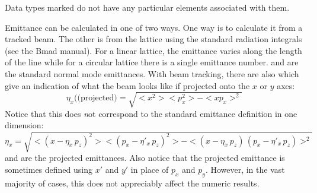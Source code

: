 Data types marked  do not have any particular elements
associated with them.

Emittance can be calculated in one of two ways. One way is to
calculate it from a tracked beam. The other is from the lattice using
the standard radiation integrals (see the Bmad manual). For a linear
lattice, the emittance varies along the length of the line while for a
circular lattice there is a single emittance number. 
and  are the standard normal mode emittances. With
beam tracking, there are also  which give an
indication of what the beam looks like if projected onto the $x$ or
$y$ axes:
\begin{equation}
  \eta_x (\mbox{(projected)} = \sqrt{<x^2> <p_x^2> - <x p_x>^2}
\end{equation}
Notice that this does {\emph not} correspond to the standard emittance
definition in one dimension:
\begin{equation}
  \eta_x = \sqrt{<(x - \eta_x \, p_z)^2> <(p_x - \eta'_x \, p_z)^2> - 
  <(x - \eta_x \, p_z) \, (p_x - \eta'_x \, p_z)>^2}
\end{equation}
 and  are the projected emittances.
Also notice that the projected emittance is sometimes defined using
$x'$ and $y'$ in place of $p_x$ and $p_y$. However, in the vast
majority of cases, this does not appreciably affect the numeric
results.

